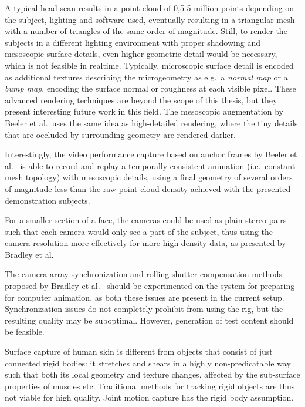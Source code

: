 A typical head scan results in a point cloud of 0,5-5 million points depending on the subject, lighting and software used, eventually resulting in a triangular mesh with a number of triangles of the same order of magnitude.
Still, to render the subjects in a different lighting environment with proper shadowing and mesoscopic surface details, even higher geometric detail would be necessary, which is not feasible in realtime.
Typically, microscopic surface detail is encoded as additional textures describing the microgeometry as e.g.\ a \emph{normal map} or a \emph{bump map}, encoding the surface normal or roughness at each visible pixel.
These advanced rendering techniques are beyond the scope of this thesis, but they present interesting future work in this field.
The mesoscopic augmentation by Beeler et al.\ uses the same idea as high-detailed rendering, where the tiny details that are occluded by surrounding geometry are rendered darker. \cite{beeler2010high}

Interestingly, the video performance capture based on anchor frames by Beeler et al.\ \cite{beeler2011high} is able to record and replay a temporally consistent animation (i.e.\ constant mesh topology) with mesoscopic details, using a final geometry of several orders of magnitude less than the raw point cloud density achieved with the presented demonstration subjects.

For a smaller section of a face, the cameras could be used as plain stereo pairs such that each camera would only see a part of the subject, thus using the camera resolution more effectively for more high density data, as presented by Bradley et al.\ \cite{bradley2010high}

The camera array synchronization and rolling shutter compensation methods proposed by Bradley et al.\ \cite{bradley2009synchronization} should be experimented on the system for preparing for computer animation, as both these issues are present in the current setup.
Synchronization issues do not completely prohibit from using the rig, but the resulting quality may be suboptimal.
However, generation of test content should be feasible.


Surface capture of human skin is different from objects that consist of just connected rigid bodies: it stretches and shears in a highly non-predicatable way such that both its local geometry and texture changes, affected by the sub-surface properties of muscles etc.
Traditional methods for tracking rigid objects are thus not viable for high quality.
Joint motion capture has the rigid body assumption.

